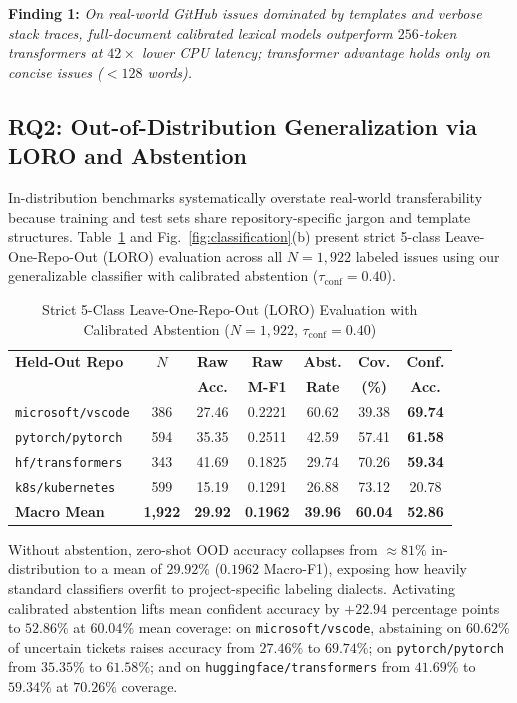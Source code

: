 \documentclass[conference]{IEEEtran}
\begin{document}
\textbf{Finding 1:} \emph{On real-world GitHub issues dominated by templates and verbose stack traces, full-document calibrated lexical models outperform $256$-token transformers at $42\times$ lower CPU latency; transformer advantage holds only on concise issues ($<128$ words).}

\subsection{RQ2: Out-of-Distribution Generalization via LORO and Abstention}
\label{sec:results_loro}

In-distribution benchmarks systematically overstate real-world transferability because training and test sets share repository-specific jargon and template structures. Table~\ref{tab:loro} and Fig.~\ref{fig:classification}(b) present strict 5-class Leave-One-Repo-Out (LORO) evaluation across all $N=1{,}922$ labeled issues using our generalizable classifier with calibrated abstention ($\tau_{\text{conf}} = 0.40$).

\begin{table}[t]
\centering
\caption{Strict 5-Class Leave-One-Repo-Out (LORO) Evaluation with Calibrated Abstention ($N=1{,}922$, $\tau_{\text{conf}}=0.40$)}
\label{tab:loro}
\setlength{\tabcolsep}{3.6pt}
\begin{tabular}{@{}lcccccc@{}}
\toprule
\textbf{Held-Out Repo} & \textbf{$N$} & \textbf{Raw} & \textbf{Raw} & \textbf{Abst.} & \textbf{Cov.} & \textbf{Conf.} \\
 & & \textbf{Acc.} & \textbf{M-F1} & \textbf{Rate} & \textbf{(\%)} & \textbf{Acc.} \\
\midrule
\texttt{microsoft/vscode} & 386 & 27.46 & 0.2221 & 60.62 & 39.38 & \textbf{69.74} \\
\texttt{pytorch/pytorch} & 594 & 35.35 & 0.2511 & 42.59 & 57.41 & \textbf{61.58} \\
\texttt{hf/transformers} & 343 & 41.69 & 0.1825 & 29.74 & 70.26 & \textbf{59.34} \\
\texttt{k8s/kubernetes} & 599 & 15.19 & 0.1291 & 26.88 & 73.12 & 20.78 \\
\midrule
\textbf{Macro Mean} & \textbf{1,922} & \textbf{29.92} & \textbf{0.1962} & \textbf{39.96} & \textbf{60.04} & \textbf{52.86} \\
\bottomrule
\end{tabular}
\end{table}

Without abstention, zero-shot OOD accuracy collapses from $\approx 81\%$ in-distribution to a mean of \textbf{$29.92\%$} ($0.1962$ Macro-F1), exposing how heavily standard classifiers overfit to project-specific labeling dialects. Activating calibrated abstention lifts mean confident accuracy by $+22.94$ percentage points to \textbf{$52.86\%$} at $60.04\%$ mean coverage: on \texttt{microsoft/vscode}, abstaining on $60.62\%$ of uncertain tickets raises accuracy from $27.46\%$ to \textbf{$69.74\%$}; on \texttt{pytorch/pytorch} from $35.35\%$ to \textbf{$61.58\%$}; and on \texttt{huggingface/transformers} from $41.69\%$ to \textbf{$59.34\%$} at $70.26\%$ coverage.
\end{document}
